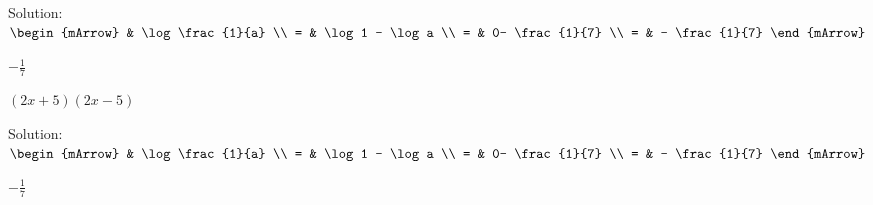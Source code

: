 \begin{enumerate}
\begin{subtask}
\begin{exercise}
\begin{envSolution}
			            Solution:\\[0.5cm]
                        \-\hspace{1.5cm} $\begin{mArrow}
                                  &  \log \frac{1}{a}                   \\
							    = &  \log 1 - \log a                   \\
     						    = & 0- \frac{1}{7}                     \\ 
             					= & - \frac{1}{7}			
						  \end{mArrow}$			   
                        \begin{shortsolution}  
				           $  -\frac{1}{7} $
			            \end{shortsolution}				 
                    \end{envSolution}
               \end{exercise}
           \task $ (2x+5)(2x-5)    	 $  
	          \begin{exercise} 
                   \begin{envSolution}
			            Solution:\\[0.5cm]
                        \-\hspace{1.5cm} $\begin{mArrow}
                                  &  \log \frac{1}{a}                   \\
							    = &  \log 1 - \log a                   \\
     						    = & 0- \frac{1}{7}                     \\ 
             					= & - \frac{1}{7}			
						  \end{mArrow}$			   
                        \begin{shortsolution}  
				           $  -\frac{1}{7} $
			            \end{shortsolution}				 
                    \end{envSolution}
               \end{exercise}
		\end{subtask}	   

\end{enumerate}